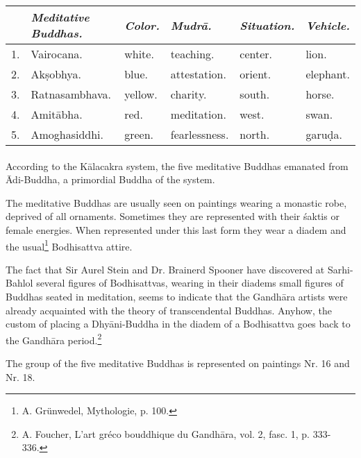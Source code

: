 \documentclass[a4paper, 12pt, oneside]{article}
\begin{document}
\begin{table}[H]
    \centering
    \small
    \begin{tabular}{l l l l l l}
   
        ~ &  \emph{Meditative Buddhas.}  &  \emph{Color.}  &  \emph{Mudr\={a}.}       &  \emph{Situation.}  &  \emph{Vehicle.}  \\ \hline
        1. &  Vairocana.             &  white.    &  teaching.      &  center.       &  lion.       \\
        2. &  Ak\d{s}obhya.              &  blue.     &  attestation.   &  orient.       &  elephant.   \\
        3. &  Ratnasambhava.         &  yellow.   &  charity.       &  south.        &  horse.      \\
        4. &  Amit\={a}bha.              &  red.      &  meditation.    &  west.         &  swan.       \\
        5. &  Amoghasiddhi.          &  green.    &  fearlessness.  &  north.        &  garu\d{d}a. \\
    \end{tabular}
\end{table}
\paragraph{}
According to the K\={a}lacakra system, the five meditative Buddhas emanated from \={A}di-Buddha, a primordial Buddha of the system.

The meditative Buddhas are usually seen on paintings wearing a monastic robe, deprived of all ornaments. Sometimes they are represented with their \'{s}aktis or female energies. When represented under this last form they wear a diadem and the usual\footnote{A. Grünwedel, Mythologie, p. 100.} Bodhisattva attire.

The fact that Sir Aurel Stein and Dr. Brainerd Spooner have discovered at Sarhi-Bahlol several figures of Bodhisattvas, wearing in their diadems small figures of Buddhas seated in meditation, seems to indicate that the Gandh\={a}ra artists were already acquainted with the theory of transcendental Buddhas. Anyhow, the custom of placing a Dhy\={a}ni-Buddha in the diadem of a Bodhisattva goes back to the Gandh\={a}ra period.\footnote{A. Foucher, L'art gréco bouddhique du Gandh\={a}ra, vol. 2, fasc. 1, p. 333-336.}

The group of the five meditative Buddhas is represented on paintings Nr. 16 and Nr. 18.

\bigskip
\end{document}
